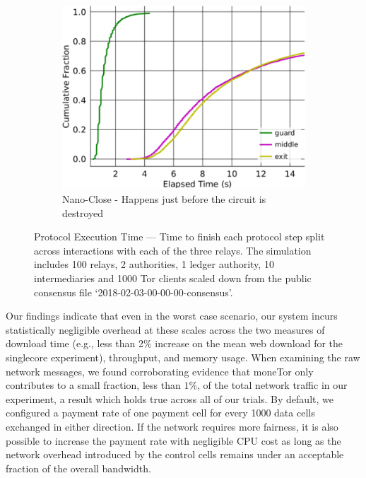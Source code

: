 \begin{figure}[t]
\begin{subfigure}[t]{0.32\textwidth}
    \label{fig:ttfp}
  \end{subfigure}
  \begin{subfigure}[t]{0.32\textwidth} \centering
    \includegraphics[trim={0 0cm 0 0cm}, clip, width=1.0\textwidth]{images/payment_close.pdf}
    \caption{Nano-Close - Happens just before the circuit is destroyed}
    \label{fig:payments_close}
  \end{subfigure}
  \caption{Protocol Execution Time --- Time to finish each protocol step split across interactions with each of the three relays.
    The simulation includes 100 relays, 2 authorities, 1 ledger authority, 10 intermediaries and 1000 Tor clients scaled down from the public consensus file `2018-02-03-00-00-00-consensus'.}
  \label{fig:latencymeasurements}
\end{figure}

Our findings indicate that even in the worst case scenario, our system incurs statistically negligible overhead at these scales across the two measures of download time (e.g., less than 2\% increase on the mean web download for the singlecore experiment), throughput, and memory usage.
When examining the raw network messages, we found corroborating evidence that moneTor only contributes to a small fraction, less than $1\%$, of the total network traffic in our experiment, a result which holds true across all of our trials.
By default, we configured a payment rate of one payment cell for every 1000 data cells exchanged in either direction.
If the network requires more fairness, it is also possible to increase the payment rate with negligible CPU cost as long as the network overhead introduced by the control cells remains under an acceptable fraction of the overall bandwidth.

